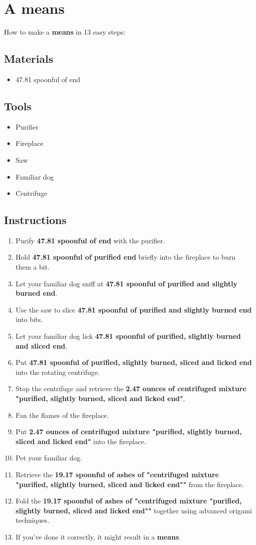 \documentclass{article}
\begin{document}
\section{A means}How to make a \textbf{means} in 13 easy steps:

\subsection{Materials}\begin{itemize}
\item 
47.81 spoonful of end
\end{itemize}
\subsection{Tools}\begin{itemize}
\item 
Purifier
\item 
Fireplace
\item 
Saw
\item 
Familiar dog
\item 
Centrifuge
\end{itemize}
\subsection{Instructions}\begin{enumerate}
\item 
Purify \textbf{47.81 spoonful of end} with the purifier.
\item 
Hold \textbf{47.81 spoonful of purified end} briefly into the fireplace to burn them a bit.
\item 
Let your familiar dog sniff at \textbf{47.81 spoonful of purified and slightly burned end}.
\item 
Use the saw to slice \textbf{47.81 spoonful of purified and slightly burned end} into bits.
\item 
Let your familiar dog lick \textbf{47.81 spoonful of purified, slightly burned and sliced end}.
\item 
Put \textbf{47.81 spoonful of purified, slightly burned, sliced and licked end} into the rotating centrifuge.
\item 
Stop the centrifuge and retrieve the \textbf{2.47 ounces of centrifuged mixture "purified, slightly burned, sliced and licked end"}.
\item 
Fan the flames of the fireplace.
\item 
Put \textbf{2.47 ounces of centrifuged mixture "purified, slightly burned, sliced and licked end"} into the fireplace.
\item 
Pet your familiar dog.
\item 
Retrieve the \textbf{19.17 spoonful of ashes of "centrifuged mixture "purified, slightly burned, sliced and licked end""} from the fireplace.
\item 
Fold the \textbf{19.17 spoonful of ashes of "centrifuged mixture "purified, slightly burned, sliced and licked end""} together using advanced origami techniques.
\item 
If you've done it correctly, it might result in a \textbf{means}.
\end{enumerate}
\newpage
\end{document}
